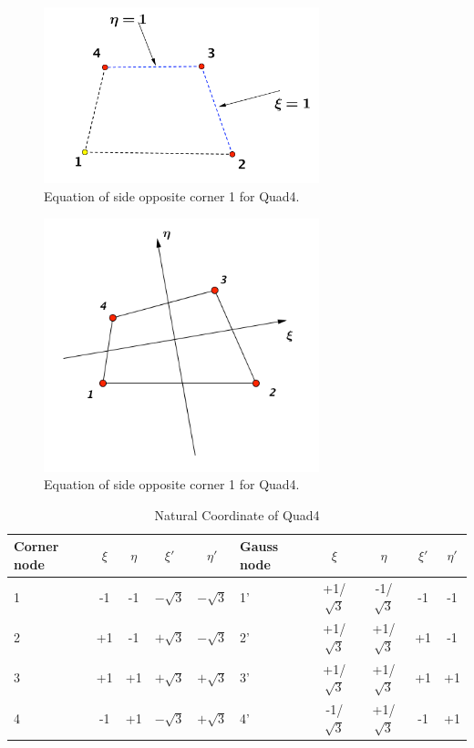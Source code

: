 \begin{figure}[h]
	\begin{center}
		\includegraphics[width=8cm,clip]{Quad4_2.pdf}			
		\caption{Equation of side opposite corner 1 for Quad4.} \label{fig: Quad4_2}
	\end{center} 
\end{figure}

\begin{figure}[h]
	\begin{center}
		\includegraphics[width=8cm,clip]{Quad4_basic.pdf}			
		\caption{Equation of side opposite corner 1 for Quad4.} \label{fig: Quad4_basic}
	\end{center} 
\end{figure}

\begin{table}
	\centering
	\caption{Natural Coordinate of Quad4}
	\label{tab: Quad4}
	\begin{tabular}{p{1cm}ccccp{1cm}cccc}			
		\hline
		Corner node\centering& $\xi$& $\eta$& $\xi'$& $\eta'$& Gauss node\centering& $\xi$& $\eta$& $\xi'$& $\eta'$ \\
		\hline
		1\centering& -1& -1& $-\sqrt{3}$& $-\sqrt{3}$& 1'\centering& +1/$\sqrt{3}$& -1/$\sqrt{3}$& -1& -1 \\
		2\centering& +1& -1& $+\sqrt{3}$& $-\sqrt{3}$& 2'\centering& +1/$\sqrt{3}$& +1/$\sqrt{3}$& +1& -1 \\
		3\centering& +1& +1& $+\sqrt{3}$& $+\sqrt{3}$& 3'\centering& +1/$\sqrt{3}$& +1/$\sqrt{3}$& +1& +1\\
		4\centering& -1& +1& $-\sqrt{3}$& $+\sqrt{3}$& 4'\centering& -1/$\sqrt{3}$& +1/$\sqrt{3}$& -1& +1\\
		\hline
	\end{tabular}
\end{table}		

